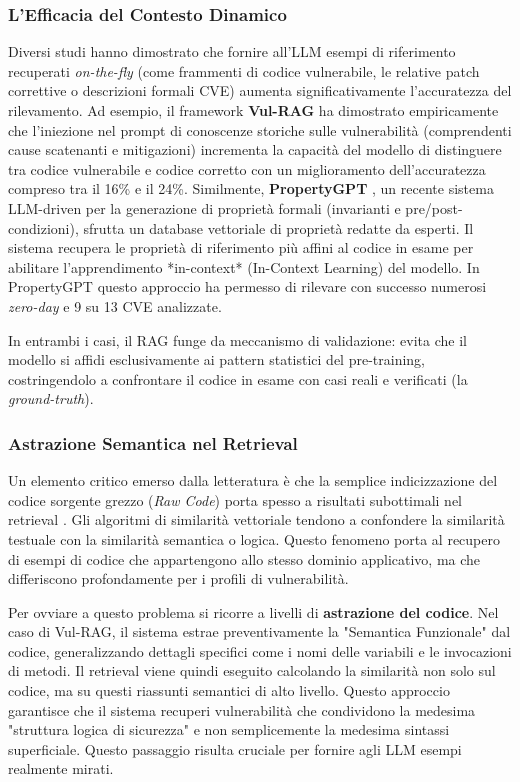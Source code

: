 \subsubsection{L'Efficacia del Contesto Dinamico}
Diversi studi hanno dimostrato che fornire all'LLM esempi di riferimento recuperati \textit{on-the-fly} (come frammenti di codice vulnerabile, le relative patch correttive o descrizioni formali CVE) aumenta significativamente l'accuratezza del rilevamento.
Ad esempio, il framework \textbf{Vul-RAG} \cite{vulrag2024} ha dimostrato empiricamente che l'iniezione nel prompt di conoscenze storiche sulle vulnerabilità (comprendenti cause scatenanti e mitigazioni) incrementa la capacità del modello di distinguere tra codice vulnerabile e codice corretto con un miglioramento dell'accuratezza compreso tra il 16\% e il 24\%.
Similmente, \textbf{PropertyGPT} \cite{propertygpt2025}, un recente sistema LLM-driven per la generazione di proprietà formali (invarianti e pre/post-condizioni), sfrutta un database vettoriale di proprietà redatte da esperti. Il sistema recupera le proprietà di riferimento più affini al codice in esame per abilitare l'apprendimento *in-context* (In-Context Learning) del modello. In PropertyGPT questo approccio ha permesso di rilevare con successo numerosi \textit{zero-day} e 9 su 13 CVE analizzate.

In entrambi i casi, il RAG funge da meccanismo di validazione: evita che il modello si affidi esclusivamente ai pattern statistici del pre-training, costringendolo a confrontare il codice in esame con casi reali e verificati (la \textit{ground-truth}).

\subsubsection{Astrazione Semantica nel Retrieval}
Un elemento critico emerso dalla letteratura è che la semplice indicizzazione del codice sorgente grezzo (\textit{Raw Code}) porta spesso a risultati subottimali nel retrieval \cite{vulrag2024}.
Gli algoritmi di similarità vettoriale tendono a confondere la similarità testuale con la similarità semantica o logica. Questo fenomeno porta al recupero di esempi di codice che appartengono allo stesso dominio applicativo, ma che differiscono profondamente per i profili di vulnerabilità.

Per ovviare a questo problema si ricorre a livelli di \textbf{astrazione del codice}.
Nel caso di Vul-RAG, il sistema estrae preventivamente la "Semantica Funzionale" dal codice, generalizzando dettagli specifici come i nomi delle variabili e le invocazioni di metodi. Il retrieval viene quindi eseguito calcolando la similarità non solo sul codice, ma su questi riassunti semantici di alto livello.
Questo approccio garantisce che il sistema recuperi vulnerabilità che condividono la medesima "struttura logica di sicurezza" e non semplicemente la medesima sintassi superficiale. Questo passaggio risulta cruciale per fornire agli LLM esempi realmente mirati.



